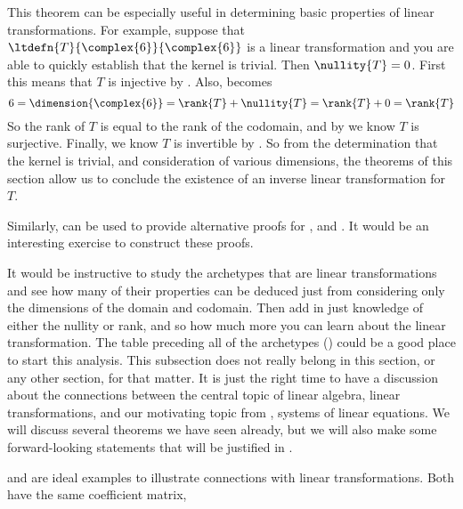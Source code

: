 %
This theorem can be especially useful in determining basic properties of linear transformations.  For example, suppose that $\ltdefn{T}{\complex{6}}{\complex{6}}$ is a linear transformation and you are able to quickly establish that the kernel is trivial.  Then $\nullity{T}=0$.  First this means that $T$ is injective by .  Also,  becomes
%
\begin{equation*}
6=\dimension{\complex{6}}=\rank{T}+\nullity{T}=\rank{T}+0=\rank{T}
\end{equation*}
%
So the rank of $T$ is equal to the rank of the codomain, and by  we know $T$ is surjective.  Finally, we know $T$ is invertible by .  So from the determination that the kernel is trivial, and consideration of various dimensions, the theorems of this section allow us to conclude the existence of an inverse linear transformation for $T$.\par
%
Similarly,  can be used to provide alternative proofs for ,  and .  It would be an interesting exercise to construct these proofs.\par
%
It would be instructive to study the archetypes that are linear transformations and see how many of their properties can be deduced just from considering only the dimensions of the domain and codomain.  Then add in just knowledge of either the nullity or rank, and so how much more you can learn about the linear transformation.  The table preceding all of the archetypes () could be a good place to start this analysis.
%
%
%
This subsection does not really belong in this section, or any other section, for that matter.  It is just the right time to have a discussion about the connections between the central topic of linear algebra, linear transformations, and our motivating topic from , systems of linear equations.  We will discuss several theorems we have seen already, but we will also make some forward-looking statements that will be justified in .\par
%
 and  are ideal examples to illustrate connections with linear transformations.  Both have the same coefficient matrix,
